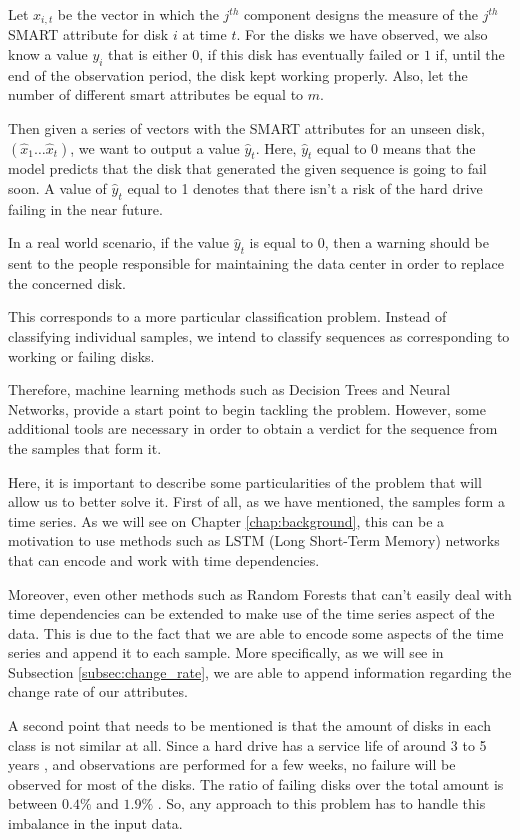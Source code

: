 Let $x_{i,t}$ be the vector in which the $j^{th}$ component designs the measure of the $j^{th}$ SMART attribute for disk $i$ at time $t$.
For the disks we have observed, we also know a value $y_i$ that is either $0$, if this disk has eventually failed or $1$ if, until the end of the observation period, the disk kept working properly.
Also, let the number of different smart attributes be equal to $m$.

Then given a series of vectors with the SMART attributes for an unseen disk, $\left(\hat{x}_1\dots\hat{x}_t\right)$, we want to output a value $\hat{y}_t$.
Here, $\hat{y}_t$ equal to 0 means that the model predicts that the disk that generated the given sequence is going to fail soon.
A value of $\hat{y}_t$ equal to 1 denotes that there isn't a risk of the hard drive failing in the near future.

In a real world scenario, if the value $\hat{y}_t$ is equal to $0$, then a warning should be sent to the people responsible for maintaining the data center in order to replace the concerned disk.

This corresponds to a more particular classification problem.
Instead of classifying individual samples, we intend to classify sequences as corresponding to working or failing disks.

Therefore, machine learning methods such as Decision Trees and Neural Networks, provide a start point to begin tackling the problem.
However, some additional tools are necessary in order to obtain a verdict for the sequence from the samples that form it.

Here, it is important to describe some particularities of the problem that will allow us to better solve it.
First of all, as we have mentioned, the samples form a time series.
As we will see on Chapter \ref{chap:background}, this can be a motivation to use methods such as LSTM (Long Short-Term Memory) networks that can encode and work with time dependencies.

Moreover, even other methods such as Random Forests that can't easily deal with time dependencies can be extended to make use of the time series aspect of the data.
This is due to the fact that we are able to encode some aspects of the time series and append it to each sample.
More specifically, as we will see in Subsection \ref{subsec:change_rate}, we are able to append information regarding the change rate of our attributes.

A second point that needs to be mentioned is that the amount of disks in each class is not similar at all.
Since a hard drive has a service life of around 3 to 5 years \cite{Vishwanath10}, and observations are performed for a few weeks, no failure will be observed for most of the disks.
The ratio of failing disks over the total amount is between $0.4\%$ and $1.9\%$ \cite{Xu16}.
So, any approach to this problem has to handle this imbalance in the input data.

